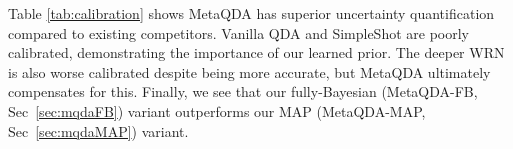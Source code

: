 \documentclass[10pt,twocolumn,letterpaper]{article}
\def\miniIN{\textit{mini}ImageNet}
\begin{document}
Table \ref{tab:calibration} shows MetaQDA has superior uncertainty quantification compared to existing competitors. Vanilla QDA and SimpleShot are poorly calibrated, demonstrating the importance of our learned prior. The deeper WRN is also worse calibrated despite being more accurate, but MetaQDA ultimately compensates for this. Finally, we see that our fully-Bayesian (MetaQDA-FB, Sec~\ref{sec:mqdaFB}) variant outperforms our MAP (MetaQDA-MAP, Sec~\ref{sec:mqdaMAP}) variant.
\setlength{\tabcolsep}{4.8pt}
\begin{table}[tb]
\centering
\footnotesize
{}
\caption{\small \small
\textbf{Calibration error (ECE) comparison on \miniIN.} Lower is better. TS indicates temperature scaling. 
}
\vspace{-0.5em}
\label{tab:calibration}
\end{table}
\end{document}

